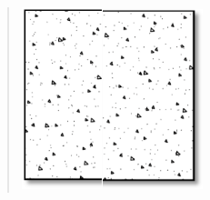 \documentclass[
]{article}
\begin{document}
\begin{quote}
\includegraphics[width=0.92361in,height=2.08055in]{vertopal_2361032064654423b71b7db67d98c753/media/image5.png}\includegraphics[width=1.15694in,height=2.05833in]{vertopal_2361032064654423b71b7db67d98c753/media/image6.png}
\end{quote}
\end{document}
